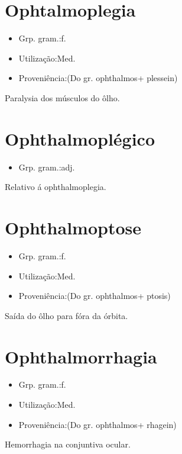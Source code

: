 \section{Ophtalmoplegia}
\begin{itemize}
\item {Grp. gram.:f.}
\end{itemize}
\begin{itemize}
\item {Utilização:Med.}
\end{itemize}
\begin{itemize}
\item {Proveniência:(Do gr. \textunderscore ophthalmos\textunderscore  + \textunderscore plessein\textunderscore )}
\end{itemize}
Paralysia dos músculos do ôlho.
\section{Ophthalmoplégico}
\begin{itemize}
\item {Grp. gram.:adj.}
\end{itemize}
Relativo á ophthalmoplegia.
\section{Ophthalmoptose}
\begin{itemize}
\item {Grp. gram.:f.}
\end{itemize}
\begin{itemize}
\item {Utilização:Med.}
\end{itemize}
\begin{itemize}
\item {Proveniência:(Do gr. \textunderscore ophthalmos\textunderscore  + \textunderscore ptosis\textunderscore )}
\end{itemize}
Saída do ôlho para fóra da órbita.
\section{Ophthalmorrhagia}
\begin{itemize}
\item {Grp. gram.:f.}
\end{itemize}
\begin{itemize}
\item {Utilização:Med.}
\end{itemize}
\begin{itemize}
\item {Proveniência:(Do gr. \textunderscore ophthalmos\textunderscore  + \textunderscore rhagein\textunderscore )}
\end{itemize}
Hemorrhagia na conjuntiva ocular.
